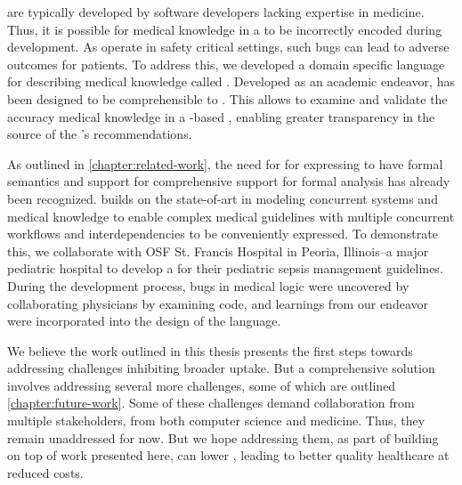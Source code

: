 \CDSSs{} are typically developed by software developers lacking expertise in
medicine. Thus, it is possible for medical knowledge in a \CDSS{} to be incorrectly
encoded during development. As \CDSSs{} operate in safety critical settings, such
bugs can lead to adverse outcomes for patients. To address this,
we developed a domain specific language for describing medical knowledge
called \MediK{}. Developed as an academic endeavor, \MediK{} has been designed to be
comprehensible to \HCPs{}. This allows \HCPs{} to examine and validate the accuracy
medical knowledge in a \MediK-based \CDSS{}, enabling greater transparency in
the source of the \CDSS{}'s recommendations.

As outlined in \autoref{chapter:related-work}, the need for \DSLs{} for
expressing \BPGs{} to have formal semantics and support for comprehensive
support for formal analysis has already been recognized. \MediK{} builds
on the state-of-art in modeling concurrent systems and medical knowledge
to enable complex medical guidelines with multiple concurrent workflows
and interdependencies to be conveniently expressed. To demonstrate this,
we collaborate with OSF St. Francis Hospital in Peoria, Illinois--a
major pediatric hospital to develop a \CDSS{} for their pediatric
sepsis management guidelines. During the development process, bugs in
medical logic were uncovered by collaborating physicians by examining
\MediK{} code, and learnings from our endeavor were incorporated into the
design of the language.

We believe the work outlined in this thesis presents the first steps towards
addressing challenges inhibiting broader \CDSS{} uptake. But a comprehensive
solution involves addressing several more challenges, some of which are
outlined \autoref{chapter:future-work}. Some of these challenges demand
collaboration from multiple stakeholders, from both computer science and
medicine. Thus, they remain unaddressed for now. But we hope addressing
them, as part of building on top of work presented here, can lower \PMEs{},
leading to better quality healthcare at reduced costs.
